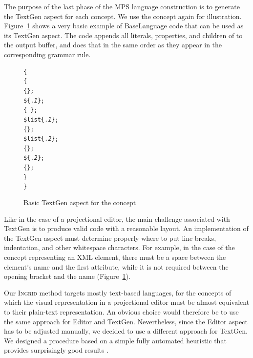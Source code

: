 The purpose of the last phase of the MPS language construction is to generate the TextGen aspect for each concept.
We use the  concept again for illustration.
Figure~\ref{fig:TEXTGENBASIC} shows a very basic example of BaseLanguage code that can be used as its TextGen aspect.
The code appends all literals, properties, and children of  to the output buffer, and does that in the same order as they appear in the corresponding grammar rule.

\begin{figure}[ht]
\begin{alltt}
\small
{}  \{
   \{
     \{\mpstgliteral{<}\};
     \$\{.\textit{1}\};
     \{\ \};
     \$list\{.\textit{1}\};
     \{\mpstgliteral{>}\};
     \$list\{.\textit{2}\};
     \{\mpstgliteral{</}\};
     \$\{.\textit{2}\};
     \{\mpstgliteral{>}\};
  \}
\}
\end{alltt}
\caption{Basic TextGen aspect for the  concept}
\label{fig:TEXTGENBASIC}
\end{figure}

Like in the case of a projectional editor, the main challenge associated with TextGen is to produce valid code with a reasonable layout.
An implementation of the TextGen aspect must determine properly where to put line breaks, indentation, and other whitespace characters.
For example, in the case of the concept representing an XML element, there must be a space between the element's name and the first attribute, while it is not required between the opening bracket \antlrliteral{\textless} and the name (Figure~\ref{fig:TEXTGENBASIC}).

Our \textsc{Ingrid} method targets mostly text-based languages, for the concepts of which the visual representation in a projectional editor must be almost equivalent to their plain-text representation.
An obvious choice would therefore be to use the same approach for Editor and TextGen.
Nevertheless, since the Editor aspect has to be adjusted manually, we decided to use a different approach for TextGen.
We designed a procedure based on a simple fully automated heuristic that provides surprisingly good results .


